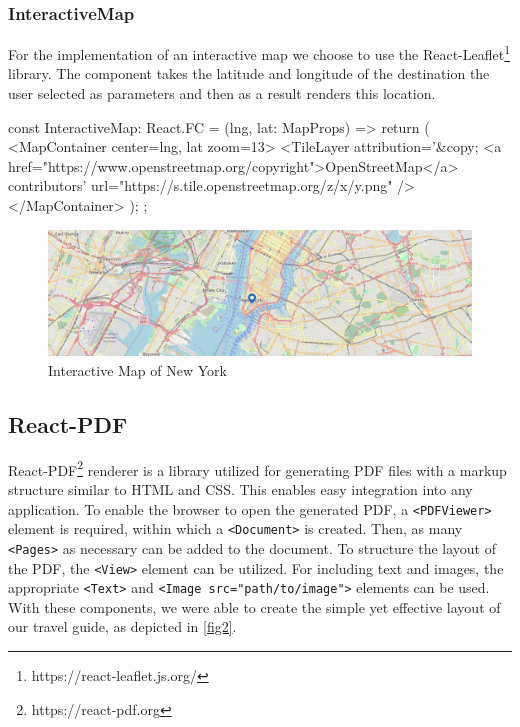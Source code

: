 \documentclass[english,notitlepage,smartquotes]{hgbreport}
\begin{document}
\subsubsection{InteractiveMap} \label{InteractiveMap}
For the implementation of an interactive map we choose to use the React-Leaflet\footnote{https://react-leaflet.js.org/} library. The component takes the latitude and longitude of the destination the user selected as parameters and then as a result renders this location.
\begin{PythonCode}
	const InteractiveMap: React.FC = ({lng, lat}: MapProps) => {
		return (
		<MapContainer center={{lng, lat}} zoom={13}>
		<TileLayer
		attribution='&copy; <a href="https://www.openstreetmap.org/copyright">OpenStreetMap</a> contributors'
		url="https://{s}.tile.openstreetmap.org/{z}/{x}/{y}.png"
		/>
		</MapContainer>
		);
	};
\end{PythonCode}
\begin{figure}[H]
	\centering
	\includegraphics[width=1\textwidth]{interactiveMap.png}
	\caption{Interactive Map of New York}
	\label{figInteractiveMap}
\end{figure}

\subsection{React-PDF} \label{ReactPDF}

React-PDF\footnote{https://react-pdf.org} renderer is a library utilized for generating PDF files with a markup structure similar to HTML and CSS. This enables easy integration into any application. To enable the browser to open the generated PDF, a \texttt{<PDFViewer>} element is required, within which a \texttt{<Document>} is created. Then, as many \texttt{<Pages>} as necessary can be added to the document. To structure the layout of the PDF, the \texttt{<View>} element can be utilized. For including text and images, the appropriate \texttt{<Text>} and \texttt{<Image src="path/to/image">} elements can be used. With these components, we were able to create the simple yet effective layout of our travel guide, as depicted in \ref{fig2}.
\end{document}
